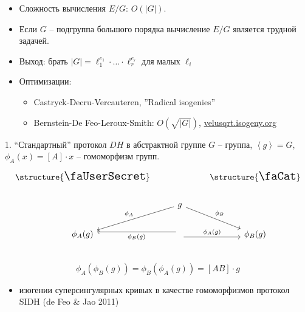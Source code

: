 \documentclass{beamer}
\begin{document}
\begin{frame}
	\begin{itemize}
		\item Сложность вычисления $E/G$: $O(|G|)$.
		\item Если $G$ -- подгруппа большого порядка вычисление $E/G$ является трудной задачей.
		\item Выход: брать $|G| = \ell_1^{e_1} \cdot \ldots \cdot \ell_r^{e_r}$ для малых $\ell_i$
		\item Оптимизации:
		\begin{itemize}
			\item Castryck-Decru-Vercauteren, ''Radical isogenies''
			\item Bernstein-De Feo-Leroux-Smith: $O(\sqrt{|G|})$, \url{velusqrt.isogeny.org}
		\end{itemize}
	\end{itemize}
\end{frame}

\begin{frame}[fragile]{1. ``Стандартный'' протокол $DH$ в абстрактной группе}
	$G$ -- группа, $\left<g\right> = G$, $\phi_A(x) = [A] \cdot x$ -- гомоморфизм групп.
	\[
	\begin{tikzcd}
		\text{\structure{{\Large\faUserSecret}}} & & \text{\structure{{\Large\faCat}}} \\
		& \arrow{ld}[swap]{\phi_A} g \arrow{rd}{\phi_B}  \\
		\phi_A(g) & \arrow[yshift=-0.7ex]{r}{\phi_A(g)} \arrow[yshift=0.7ex]{l}{\phi_B(g)}  & \phi_B(g)\\
	\end{tikzcd}
	\]
	\[
	\phi_A(\phi_B(g)) = \phi_B(\phi_A(g)) = [A B]\cdot g
	\]
	\begin{itemize}
		\item изогении суперсингулярных кривых в качестве гомоморфизмов \structure{$\Rightarrow$} протокол SIDH (de Feo \& Jao 2011)
	\end{itemize}
\end{frame}
\end{document}
